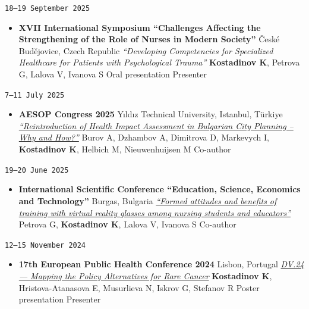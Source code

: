 \documentclass[
  10.5pt,
  a4paper,
  DIV=11,
  numbers=noendperiod]{scrartcl}
\providecommand{\tightlist}{%
  \setlength{\itemsep}{0pt}\setlength{\parskip}{0pt}}
\let\oldtexttt\texttt
\renewcommand{\texttt}[1]{{\color{cvbronze}\small\oldtexttt{#1}}}
\begin{document}
\texttt{18–19\ September\ 2025}

\begin{itemize}
\tightlist
\item
  \textbf{XVII International Symposium ``Challenges Affecting the
  Strengthening of the Role of Nurses in Modern Society''} \textbar{}
  České Budějovice, Czech Republic \textbar{} \emph{``Developing
  Competencies for Specialized Healthcare for Patients with
  Psychological Trauma''} \textbar{} \textbf{Kostadinov K}, Petrova G,
  Lalova V, Ivanova S \textbar{} Oral presentation \textbar{} Presenter
\end{itemize}

\texttt{7–11\ July\ 2025}

\begin{itemize}
\tightlist
\item
  \textbf{AESOP Congress 2025} \textbar{} Yıldız Technical University,
  Istanbul, Türkiye \textbar{}
  \emph{\href{https://archive.aesop-planning.eu/items/13b23e16-2410-40c6-a6df-3976a7457c54}{``Reintroduction
  of Health Impact Assessment in Bulgarian City Planning -- Why and
  How?''}} \textbar{} Burov A, Dzhambov A, Dimitrova D, Markevych I,
  \textbf{Kostadinov K}, Helbich M, Nieuwenhuijsen M \textbar{}
  Co-author
\end{itemize}

\texttt{19–20\ June\ 2025}

\begin{itemize}
\tightlist
\item
  \textbf{International Scientific Conference ``Education, Science,
  Economics and Technology''} \textbar{} Burgas, Bulgaria \textbar{}
  \emph{\href{https://www.conference-burgas.com/maevolumes/vol21_2025/book\%205_25.pdf}{``Formed
  attitudes and benefits of training with virtual reality glasses among
  nursing students and educators''}} \textbar{} Petrova G,
  \textbf{Kostadinov K}, Lalova V, Ivanova S \textbar{} Co-author
\end{itemize}

\texttt{12–15\ November\ 2024}

\begin{itemize}
\tightlist
\item
  \textbf{17th European Public Health Conference 2024} \textbar{}
  Lisbon, Portugal \textbar{}
  \emph{\href{https://doi.org/10.1093/eurpub/ckae144.2172}{DV.24 ---
  Mapping the Policy Alternatives for Rare Cancer}} \textbar{}
  \textbf{Kostadinov K}, Hristova-Atanasova E, Musurlieva N, Iskrov G,
  Stefanov R \textbar{} Poster presentation \textbar{} Presenter
\end{itemize}
\end{document}
